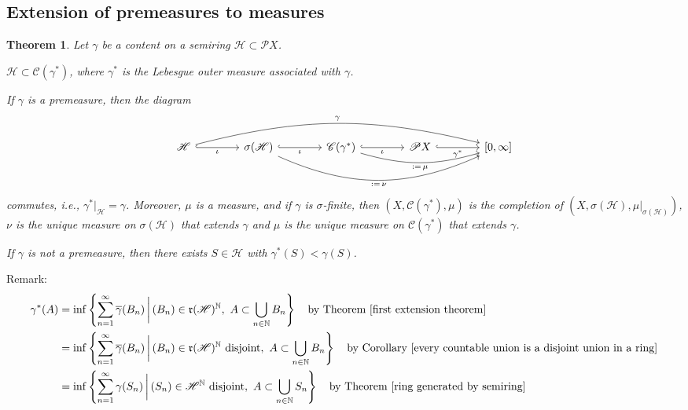 \documentclass[11pt, a4paper, openany]{book}
\newtheorem{thm}{Theorem}\newtheorem{lem}{Lemma}\newtheorem{crl}{Corollary}
\theoremstyle{definition}
\newenvironment{tight_enumerate}{\begin{enumerate}\itemsep -0.2em}{\end{enumerate}}
\begin{document}
\subsection{Extension of premeasures to measures}
    \begin{thm}\label{extension of premeasures on a semiring to measures}
       Let $\gamma$ be a content on a semiring $\mathscr{H}\subset\mathscr{P}X$.
        \begin{tight_enumerate}
            \item $\mathscr{H}\subset \mathscr{C}(\gamma^*)$, where $\gamma^*$ is the Lebesgue outer measure associated with $\gamma$.
            \item If $\gamma$ is a premeasure, then the diagram
            \[
                \begin{tikzcd}[column sep = {40pt}]
                    \mathscr{H} \ar[r, hook, "\iota"' ] \ar[rrrr, "\gamma", bend left=14] &\sigma(\mathscr{H}) \ar[r, hook, "\iota"'] \ar[rrr, ":=\,\nu"', bend right=24] & \mathscr{C}(\gamma^*) \ar[r, hook, "\iota"'] \ar[rr, ":=\,\mu"', bend right=16]& \mathscr{P}X \ar[r, hook, "\gamma^*"'] & {[0,\infty]}
                \end{tikzcd}
            \]
            commutes, i.e., $\gamma^*|_\mathscr{H}=\gamma$. Moreover, $\mu$ is a measure, and if $\gamma$ is $\sigma$-finite, then $(X,\mathscr{C}(\gamma^*),\mu)$ is the completion of $(X,\sigma(\mathscr{H}),\mu|_{\sigma(\mathscr{H})})$, $\nu$ is the unique measure on $\sigma(\mathscr{H})$ that extends $\gamma$ and $\mu$ is the unique measure on $\mathscr{C}(\gamma^*)$ that extends $\gamma$.
            \item If $\gamma$ is not a premeasure, then there exists $S\in\mathscr{H}$ with $\gamma^*(S)<\gamma(S)$.
        \end{tight_enumerate}
    \end{thm}
    Remark: %
    \begin{align*}
        \gamma^*(A)&=\inf\left\{\sum_{n=1}^\infty \overline{\gamma}(B_n)\,\bigg|\,(B_n)\in \mathfrak{r}(\mathscr{H})^\mathbb{N},\,\,A\subset \bigcup_{n\in\mathbb{N}}B_n\right\}\quad \text{by Theorem \ref{first extension theorem}}\\
        &=\inf\left\{\sum_{n=1}^\infty \overline{\gamma}(B_n)\,\bigg|\,(B_n)\in \mathfrak{r}(\mathscr{H})^\mathbb{N} \text{ disjoint},\,\,A\subset \bigcup_{n\in\mathbb{N}}B_n\right\} \quad\text{by Corollary \ref{every countable union is a disjoint union in a ring}}\\
        &=\inf\left\{\sum_{n=1}^\infty \gamma(S_n)\,\bigg|\,(S_n)\in \mathscr{H}^\mathbb{N} \text{ disjoint},\,\,A\subset \bigcup_{n\in\mathbb{N}}S_n\right\} \quad\text{by Theorem \ref{ring generated by semiring}}
    \end{align*}
\end{document}

